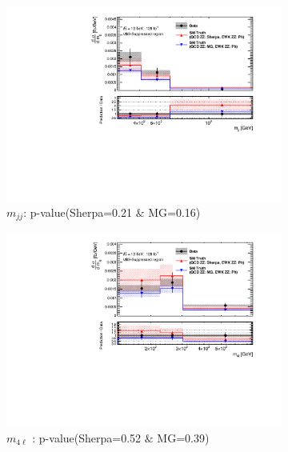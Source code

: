 \begin{figure}[!htb]
    \centering
    \begin{subfigure}{.49\textwidth}
        \centering
        \includegraphics[width=.98\linewidth]{figures/Results/CrossSection_VBSSuppressed/xs_mjj_CR.pdf}
        \caption{ \footnotesize{$m_{jj}$}: p-value(Sherpa=0.21 $\&$ MG=0.16)}
    \end{subfigure}
    \begin{subfigure}{.49\textwidth}
        \centering
        \includegraphics[width=.98\linewidth]{figures/Results/CrossSection_VBSSuppressed/xs_m4l_CR.pdf}
        \caption{ \footnotesize{$m_{4\ell}$ }: p-value(Sherpa=0.52 $\&$ MG=0.39)}
    \end{subfigure}\\
    \begin{subfigure}{.49\textwidth}

\end{subfigure}
\end{figure}
